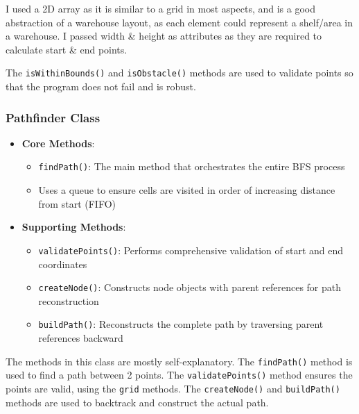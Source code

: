 I used a 2D array as it is similar to a grid in most aspects, and is a good abstraction of a warehouse layout, as each element could represent a shelf/area in a warehouse. I passed width \& height as attributes as they are required to calculate start \& end points.

The \verb|isWithinBounds()| and \verb|isObstacle()| methods are used to validate points so that the program does not fail and is robust.

\subsubsection{Pathfinder Class}
\begin{itemize}
    \item \textbf{Core Methods}:
    \begin{itemize}
        \item \texttt{findPath()}: The main method that orchestrates the entire BFS process
        \item Uses a queue to ensure cells are visited in order of increasing distance from start (FIFO)
    \end{itemize}
    \item \textbf{Supporting Methods}:
    \begin{itemize}
        \item \texttt{validatePoints()}: Performs comprehensive validation of start and end coordinates
        \item \texttt{createNode()}: Constructs node objects with parent references for path reconstruction
        \item \texttt{buildPath()}: Reconstructs the complete path by traversing parent references backward
    \end{itemize}
\end{itemize}

The methods in this class are mostly self-explanatory. The \verb|findPath()| method is used to find a path between 2 points. The \verb|validatePoints()| method ensures the points are valid, using the \verb|grid| methods. The \verb|createNode()| and \verb|buildPath()| methods are used to backtrack and construct the actual path.

\newpage

